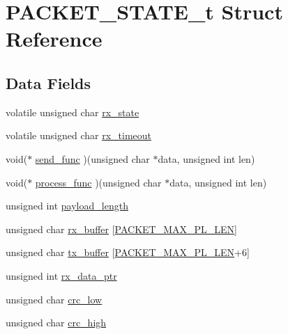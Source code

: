 \hypertarget{struct_p_a_c_k_e_t___s_t_a_t_e__t}{}\section{P\+A\+C\+K\+E\+T\+\_\+\+S\+T\+A\+T\+E\+\_\+t Struct Reference}
\label{struct_p_a_c_k_e_t___s_t_a_t_e__t}
\subsection*{Data Fields}
\begin{DoxyCompactItemize}
\item 
volatile unsigned char \hyperlink{struct_p_a_c_k_e_t___s_t_a_t_e__t_abe9daa072c4313c3a427e2b3df4dab07}{rx\+\_\+state}
\item 
volatile unsigned char \hyperlink{struct_p_a_c_k_e_t___s_t_a_t_e__t_acd7eb49fabf207bf853ee913680c30e0}{rx\+\_\+timeout}
\item 
void($\ast$ \hyperlink{struct_p_a_c_k_e_t___s_t_a_t_e__t_ad9da6fc089f08736831dcd7554620f68}{send\+\_\+func} )(unsigned char $\ast$data, unsigned int len)
\item 
void($\ast$ \hyperlink{struct_p_a_c_k_e_t___s_t_a_t_e__t_add934c6f089d4b468f9073eb0ad1fa1a}{process\+\_\+func} )(unsigned char $\ast$data, unsigned int len)
\item 
unsigned int \hyperlink{struct_p_a_c_k_e_t___s_t_a_t_e__t_a13c41c0a911ac1a2737bf70b46e7bf3b}{payload\+\_\+length}
\item 
unsigned char \hyperlink{struct_p_a_c_k_e_t___s_t_a_t_e__t_a5db24caa62b7e0977f15a9371cd0ec39}{rx\+\_\+buffer} \mbox{[}\hyperlink{packet_8h_ac3be10b8f0586a71c9082ab78e2b23d1}{P\+A\+C\+K\+E\+T\+\_\+\+M\+A\+X\+\_\+\+P\+L\+\_\+\+L\+E\+N}\mbox{]}
\item 
unsigned char \hyperlink{struct_p_a_c_k_e_t___s_t_a_t_e__t_ae03bc7f89e1a660af9d54b0fef09a21f}{tx\+\_\+buffer} \mbox{[}\hyperlink{packet_8h_ac3be10b8f0586a71c9082ab78e2b23d1}{P\+A\+C\+K\+E\+T\+\_\+\+M\+A\+X\+\_\+\+P\+L\+\_\+\+L\+E\+N}+6\mbox{]}
\item 
unsigned int \hyperlink{struct_p_a_c_k_e_t___s_t_a_t_e__t_af32db5e837b7f29b211288109f3cfe92}{rx\+\_\+data\+\_\+ptr}
\item 
unsigned char \hyperlink{struct_p_a_c_k_e_t___s_t_a_t_e__t_a84746160d92104716de8f420158ef146}{crc\+\_\+low}
\item 
unsigned char \hyperlink{struct_p_a_c_k_e_t___s_t_a_t_e__t_a888c7914424c382213ce34ad20b0363e}{crc\+\_\+high}
\end{DoxyCompactItemize}


